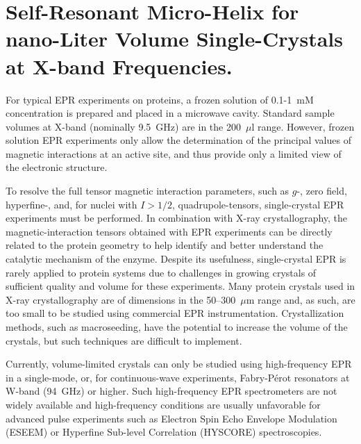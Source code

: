 \chapter[Self-Resonant Micro-Helix at X-band Frequencies]{Self-Resonant Micro-Helix for nano-Liter Volume Single-Crystals at X-band Frequencies.}

For typical EPR experiments on proteins, a frozen solution of 0.1-1~mM concentration is prepared and placed in a microwave cavity. Standard sample volumes at X-band (nominally 9.5~GHz) are in the 200~$\mu$l range. However, frozen solution EPR experiments only allow the determination of the principal values of magnetic interactions at an active site, and thus provide only a limited view of the electronic structure. \cite{schweiger2001principles, goldfarb2018epr}

To resolve the full tensor magnetic interaction parameters, such as $g$-, zero field, hyperfine-, and, for nuclei with $I>1/2$, quadrupole-tensors, single-crystal EPR experiments must be performed. In combination with X-ray crystallography, the magnetic-interaction tensors obtained with EPR experiments can be directly related to the protein geometry to help identify and better understand the catalytic mechanism of the enzyme. \cite{Bowman2016, NiFeRev2007} Despite its usefulness, single-crystal EPR is rarely applied to protein systems due to challenges in growing crystals of sufficient quality and volume for these experiments. Many protein crystals used in X-ray crystallography are of dimensions in the 50--300~$\mu$m range and, as such, are too small to be studied using commercial EPR instrumentation. Crystallization methods, such as macroseeding,\cite{macroseeding} have the potential to increase the volume of the crystals, but such techniques are difficult to implement. 

Currently, volume-limited crystals can only be studied using high-frequency EPR in a single-mode\cite{Hofbauer6623}, or, for continuous-wave experiments, Fabry-P\'{e}rot\cite{Klette94GHzPSI} resonators at W-band (94~GHz) or higher. Such high-frequency EPR spectrometers are not widely available and high-frequency conditions are usually unfavorable for advanced pulse experiments such as Electron Spin Echo Envelope Modulation (ESEEM) or Hyperfine Sub-level Correlation (HYSCORE) spectroscopies. \cite{pulseseq}

